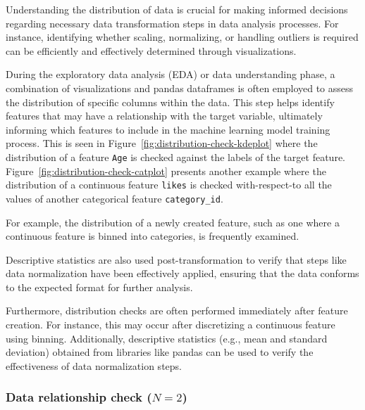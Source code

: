 Understanding the distribution of data is crucial for making informed decisions regarding necessary data transformation steps in data analysis processes. For instance, identifying whether scaling, normalizing, or handling outliers is required can be efficiently and effectively determined through visualizations.



During the exploratory data analysis (EDA) or data understanding phase, a combination of visualizations and pandas dataframes is often employed to assess the distribution of specific columns within the data. This step helps identify features that may have a relationship with the target variable, ultimately informing which features to include in the machine learning model training process. This is seen in Figure~\ref{fig:distribution-check-kdeplot} where the distribution of a feature \texttt{Age} is checked against the labels of the target feature. Figure~\ref{fig:distribution-check-catplot} presents another example where the distribution of a continuous feature \texttt{likes} is checked with-respect-to all the values of another categorical feature \texttt{category\_id}.

For example, the distribution of a newly created feature, such as one where a continuous feature is binned into categories, is frequently examined. 

Descriptive statistics are also used post-transformation to verify that steps like data normalization have been effectively applied, ensuring that the data conforms to the expected format for further analysis.


Furthermore, distribution checks are often performed immediately after feature creation. For instance, this may occur after discretizing a continuous feature using binning. Additionally, descriptive statistics (e.g., mean and standard deviation) obtained from libraries like pandas can be used to verify the effectiveness of data normalization steps.

\subsubsection{Data relationship check ($N = 2$)}

